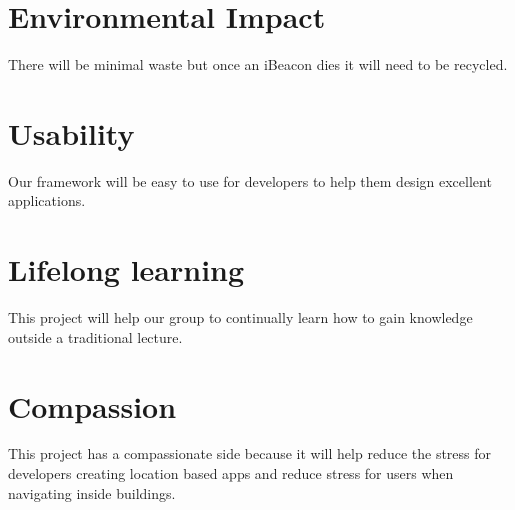 \section{Environmental Impact}
There will be minimal waste but once an iBeacon dies it will need to be recycled.
\section{Usability}
Our framework will be easy to use for developers to help them design excellent applications.
\section{Lifelong learning}
This project will help our group to continually learn how to gain knowledge outside a traditional lecture.
\section{Compassion}
This project has a compassionate side because it will help reduce the stress for developers creating location based apps and reduce stress for users when navigating inside buildings.
